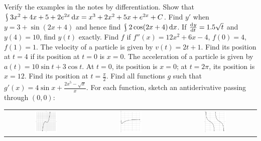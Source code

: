 \begin{questions}
\begin{multicols}{2}
    \end{multicols}
  \questioA Verify the examples in the notes by differentiation.
  \questioA Show that $ \rint 3x^2 + 4x + 5 + 2e^{2x} \dif{x} = x^3 + 2x^2 + 5x + e^{2x} + C $.
  \questioA Find $ y' $ when $ y = 3 + \sin (2x + 4) $ and hence find $ \rint 2 \cos(2x + 4) \dif{x} $.
  \questioA If $ \od{y}{t} = 1.5 \sqrt{t} $ and $ y(4) = 10 $, find $ y(t) $ exactly.
  \questioM Find $ f $ if $ f''(x) = 12x^2 + 6x - 4 $, $ f(0) = 4 $, $ f(1) = 1 $.
  \questioA The velocity of a particle is given by $ v(t) = 2t + 1 $. Find its position at $ t = 4 $
            if its position at $ t = 0 $ is $ x = 0 $.
  \questioM The acceleration of a particle is given by $ a(t) = 10\sin t + 3\cos t $. At $ t = 0 $, its position is $ x = 0 $; at $ t = 2\pi $,
            its position is $ x = 12 $. Find its position at $ t = \frac{\pi}{2} $.
  \questioA Find all functions $ g $ such that $ g'(x) = 4 \sin x + \frac{2x^5 - \sqrt{x}}{x} $.
  \questioM For each function, sketch an antiderivative passing through $ (0, 0) $:
            \begin{center}
              \begin{tabular}{ccc}
                \includegraphics[width=0.28\textwidth]{anti1}&
                \includegraphics[width=0.28\textwidth]{anti2}&
                \includegraphics[width=0.28\textwidth]{anti3}\\

\end{tabular}
\end{center}
\end{questions}
